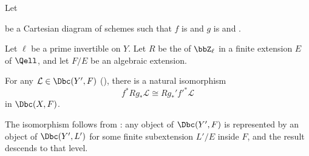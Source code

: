 \begin{theorem} \label{theorem:smooth_base_change_theorem_for_derived_category_of_adic_sheaves_with_algebraic_coefficients_on_schemes}
    Let
    \begin{center}
    \end{center}
    be a Cartesian diagram of schemes such that $f$ is  and $g$ is  and .

    Let $\ell$ be a prime invertible on $Y$. Let $R$ be the  of $\bbZ_\ell$ in a finite extension $E$ of $\Qell$, and let $F/E$ be an algebraic extension.

    For any $\mathcal{L} \in \Dbc(Y', F)$ (), there is a natural isomorphism
    $$f^* Rg_* \mathcal{L} \cong Rg_*' {f'}^* \mathcal{L}$$
    in $\Dbc(X, F)$.

    The isomorphism follows from : any object of $\Dbc(Y', F)$ is represented by an object of $\Dbc(Y', L')$ for some finite subextension $L'/E$ inside $F$, and the result descends to that level.
\end{theorem}

